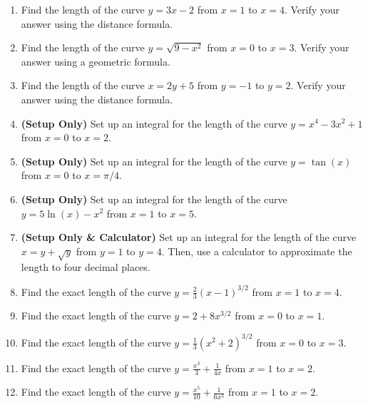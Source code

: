 \documentclass[12pt]{article}
\begin{document}
\begin{enumerate}
    \item Find the length of the curve $y = 3x - 2$ from $x = 1$ to $x = 4$. Verify your answer using the distance formula.
    
    \item Find the length of the curve $y = \sqrt{9 - x^2}$ from $x = 0$ to $x = 3$. Verify your answer using a geometric formula.
    
    \item Find the length of the curve $x = 2y + 5$ from $y = -1$ to $y = 2$. Verify your answer using the distance formula.
    
    \item \textbf{(Setup Only)} Set up an integral for the length of the curve $y = x^4 - 3x^2 + 1$ from $x = 0$ to $x = 2$.
    
    \item \textbf{(Setup Only)} Set up an integral for the length of the curve $y = \tan(x)$ from $x = 0$ to $x = \pi/4$.
    
    \item \textbf{(Setup Only)} Set up an integral for the length of the curve $y = 5\ln(x) - x^2$ from $x = 1$ to $x = 5$.
    
    \item \textbf{(Setup Only \& Calculator)} Set up an integral for the length of the curve $x = y + \sqrt{y}$ from $y = 1$ to $y = 4$. Then, use a calculator to approximate the length to four decimal places.
    
    \item Find the exact length of the curve $y = \frac{2}{3}(x-1)^{3/2}$ from $x=1$ to $x=4$.
    
    \item Find the exact length of the curve $y = 2 + 8x^{3/2}$ from $x=0$ to $x=1$.
    
    \item Find the exact length of the curve $y = \frac{1}{3}(x^2+2)^{3/2}$ from $x=0$ to $x=3$.
    
    \item Find the exact length of the curve $y = \frac{x^3}{3} + \frac{1}{4x}$ from $x = 1$ to $x = 2$.
    
    \item Find the exact length of the curve $y = \frac{x^5}{10} + \frac{1}{6x^3}$ from $x=1$ to $x=2$.
    

\end{enumerate}
\end{document}
